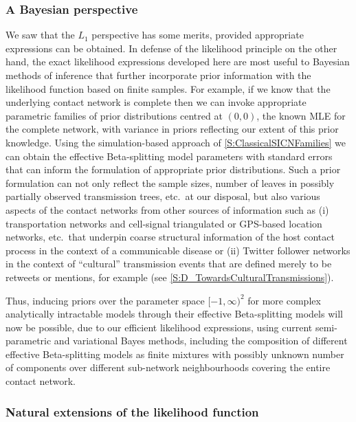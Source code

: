 \documentclass[review]{elsarticle}
\numberwithin{equation}{section}
\let\orgautoref\autoref
\renewcommand{\autoref}
        {\def\equationautorefname{Eq.}%
         \def\figureautorefname{Fig.}%
         \def\subfigureautorefname{Fig.}%
         \def\sectionautorefname{Sect.}%
         \def\subsectionautorefname{Sect.}%
         \def\subsubsectionautorefname{Sect.}%
         \def\Itemautorefname{item}%
         \def\tableautorefname{Table}%
         \def\propositionautorefname{Prop.}%
         \def\corollaryautorefname{Corollary}%
         \def\theoremautorefname{Theorem}%
         \def\remarkautorefname{Remark}%
         \def\lemmaautorefname{Lemma}%
         \def\proofofautorefname{Proof}%
         \def\exampleautorefname{Example}%
         \orgautoref}
\begin{document}
\subsubsection{A Bayesian perspective}
We saw that the $L_1$ perspective has some merits, provided appropriate expressions can be obtained.  
In defense of the likelihood principle on the other hand, the exact likelihood expressions developed here are most useful to Bayesian methods of inference that further incorporate prior information with the likelihood function based on finite samples.  
For example, if we know that the underlying contact network is complete then we can invoke appropriate parametric families of prior distributions centred at $(0,0)$, the known MLE for the complete network, with variance in priors reflecting our extent of this prior knowledge.  
Using the simulation-based approach of \autoref{S:ClassicalSICNFamilies} we can obtain 
the effective Beta-splitting model parameters with standard errors that can inform the formulation of appropriate prior distributions.  
Such a prior formulation can not only reflect the sample sizes, number of leaves in possibly partially observed transmission trees, etc.~at our disposal, but also various aspects of the contact networks from other sources of information such as 
(i) transportation networks and cell-signal triangulated or GPS-based location networks, etc.~that underpin coarse structural information of the host contact process in the context of a communicable disease or (ii) Twitter follower networks in the context of ``cultural'' transmission events that are defined merely to be retweets or mentions, for example (see \autoref{S:D_TowardsCulturalTransmissions}).  

Thus, inducing priors over the parameter space $[-1,\infty)^2$ for more complex analytically intractable models through their effective Beta-splitting models will now be possible, due to our efficient likelihood expressions, using current semi-parametric and variational Bayes methods, including the composition of different effective Beta-splitting models as finite mixtures with possibly unknown number of components over different sub-network neighbourhoods covering the entire contact network. 

\subsubsection{Natural extensions of the likelihood function}\label{S:NaturalExtensionsOfTheLikelihoodFunction}
\end{document}
